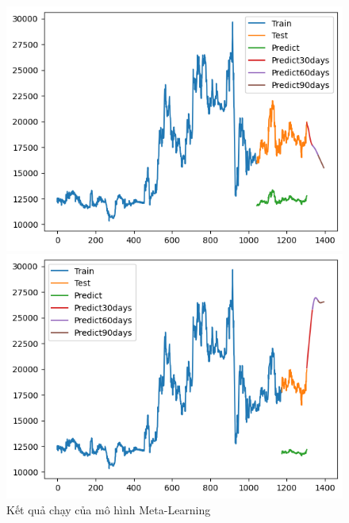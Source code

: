 \begin{figure}[H]
\begin{minipage}{0.15\textwidth}
    \end{minipage}
    \hfill
    \begin{minipage}{0.15\textwidth}
    \centering
    \includegraphics[width=1\textwidth]{resources/chapter-5/newdata1/result/EIB_ LSTM_8-2.png}
    \end{minipage}
    \hfill
        \begin{minipage}{0.15\textwidth}
    \centering
    \includegraphics[width=1\textwidth]{resources/chapter-5/newdata1/result/EIB_ LSTM_9-1.png}
    \end{minipage}
    \hfill
    
    \caption{Kết quả chạy của mô hình Meta-Learning}
    \label{fig:lstm_result}
\end{figure}


